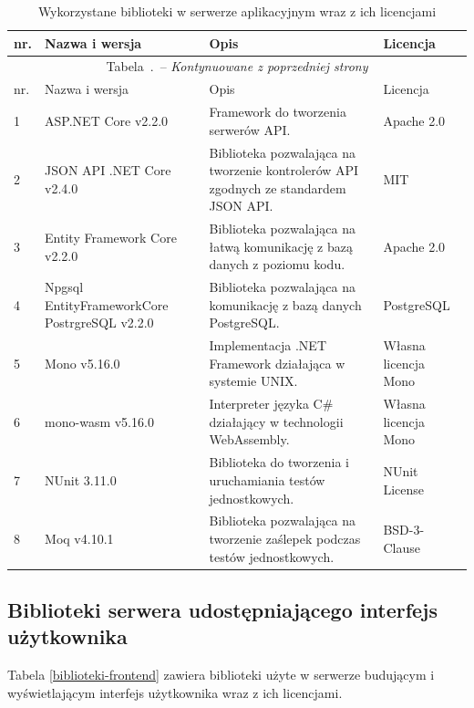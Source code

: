 \documentclass[a4paper,11pt,twoside]{report}
\renewcommand{\tablename}{Tabela}
\renewcommand*{\thetable}{\arabic{chapter}.\arabic{table}}
\theoremstyle{definition}
\begin{document}
        \begin{center}
            \begin{longtable}{| p{} | p{} | p{} | p{} |}
                \caption{Wykorzystane biblioteki w serwerze aplikacyjnym wraz z ich licencjami}
                \label{biblioteki-serwer} \\
                \hline
                nr. & Nazwa i wersja & Opis & Licencja \\ \hline
                \endfirsthead
                \multicolumn{4}{c}{\tablename\ \thetable\ -- \textit{Kontynuowane z poprzedniej strony}} \\
                \hline
                nr. & Nazwa i wersja & Opis & Licencja \\ \hline
                \endhead
                
                1 & ASP.NET Core v2.2.0 & Framework do tworzenia serwerów API. & Apache 2.0 \\ \hline
                2 & JSON API .NET Core v2.4.0 & Biblioteka pozwalająca na tworzenie kontrolerów API zgodnych ze standardem JSON API. & MIT \\ \hline
                3 & Entity Framework Core v2.2.0 & Biblioteka pozwalająca na łatwą komunikację z bazą danych z poziomu kodu. & Apache 2.0 \\ \hline
                4 & Npgsql EntityFrameworkCore PostrgreSQL v2.2.0 & Biblioteka pozwalająca na komunikację z bazą danych PostgreSQL. & PostgreSQL \cite{licencja-postgresql} \\ \hline
                5 & Mono v5.16.0 & Implementacja .NET Framework działająca w systemie UNIX. & Własna licencja Mono \cite{licencja-mono} \\ \hline
                6 & mono-wasm v5.16.0 & Interpreter języka C\# działający w technologii WebAssembly. & Własna licencja Mono \cite{licencja-mono} \\ \hline
                7 & NUnit 3.11.0 & Biblioteka do tworzenia i uruchamiania testów jednostkowych. & NUnit License \cite{licencja-nunit} \\ \hline
                8 & Moq v4.10.1 & Biblioteka pozwalająca na tworzenie zaślepek podczas testów jednostkowych. & BSD-3-Clause \\ \hline
            \end{longtable}
        \end{center}
        
        \subsection{Biblioteki serwera udostępniającego interfejs użytkownika}
        Tabela \ref{biblioteki-frontend} zawiera biblioteki użyte w serwerze budującym i wyświetlającym interfejs użytkownika wraz z ich licencjami.
        
\end{document}
